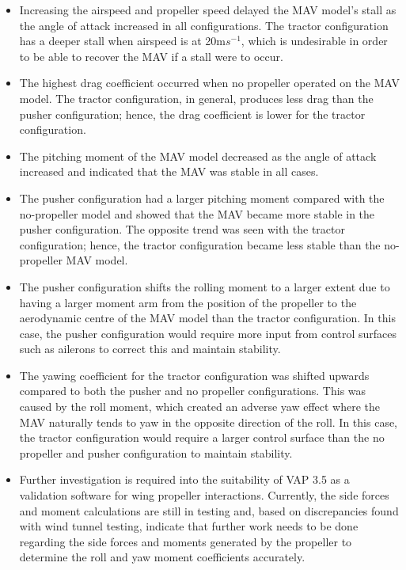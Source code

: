 \begin{itemize}

    \item Increasing the airspeed and propeller speed delayed the MAV model's stall as the angle of attack increased in all configurations. The tractor configuration has a deeper stall when airspeed is at 20m$s^{-1}$, which is undesirable in order to be able to recover the MAV if a stall were to occur. 

    \item  The highest drag coefficient occurred when no propeller operated on the MAV model. The tractor configuration, in general, produces less drag than the pusher configuration; hence, the drag coefficient is lower for the tractor configuration.  

    \item The pitching moment of the MAV model decreased as the angle of attack increased and indicated that the MAV was stable in all cases. 
    
    \item The pusher configuration had a larger pitching moment compared with the no-propeller model and showed that the MAV became more stable in the pusher configuration. The opposite trend was seen with the tractor configuration; hence, the tractor configuration became less stable than the no-propeller MAV model.

    \item The pusher configuration shifts the rolling moment to a larger extent due to having a larger moment arm from the position of the propeller to the aerodynamic centre of the MAV model than the tractor configuration. In this case, the pusher configuration would require more input from control surfaces such as ailerons to correct this and maintain stability.

    \item  The yawing coefficient for the tractor configuration was shifted upwards compared to both the pusher and no propeller configurations. This was caused by the roll moment, which created an adverse yaw effect where the MAV naturally tends to yaw in the opposite direction of the roll. In this case, the tractor configuration would require a larger control surface than the no propeller and pusher configuration to maintain stability. 
    
    \item Further investigation is required into the suitability of VAP 3.5 as a validation software for wing propeller interactions. Currently, the side forces and moment calculations are still in testing and, based on discrepancies found with wind tunnel testing, indicate that further work needs to be done regarding the side forces and moments generated by the propeller to determine the roll and yaw moment coefficients accurately. 
    
    
\end{itemize}


